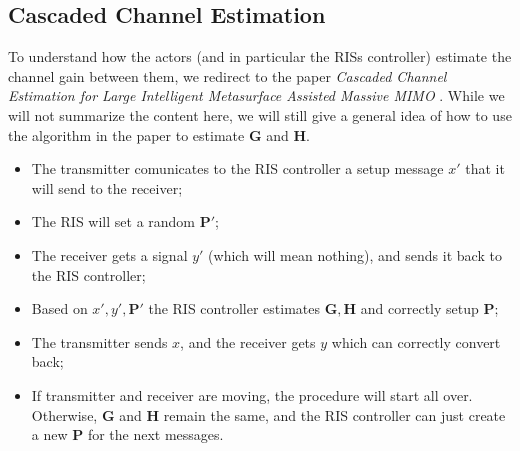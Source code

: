 \subsection{Cascaded Channel Estimation}
To understand how the actors (and in particular the RISs controller) estimate the channel gain between them, we redirect to the paper \textit{Cascaded Channel Estimation for Large Intelligent Metasurface Assisted Massive MIMO} \cite{8879620}. While we will not summarize the content here, we will still give a general idea of how to use the algorithm in the paper to estimate $\bm{G}$ and $\bm{H}$.
\begin{itemize}
  \item The transmitter comunicates to the RIS controller a setup message $x'$ that it will send to the receiver;
  \item The RIS will set a random $\bm{P}'$; %
  \item The receiver gets a signal $y'$ (which will mean nothing), and sends it back to the RIS controller;
  \item Based on $x', y', \bm{P}'$ the RIS controller estimates $\bm{G}, \bm{H}$ and correctly setup $\bm{P}$;
  \item The transmitter sends $x$, and the receiver gets $y$ which can correctly convert back;
  \item If transmitter and receiver are moving, the procedure will start all over. Otherwise, $\bm{G}$ and $\bm{H}$ remain the same, and the RIS controller can just create a new $\bm{P}$ for the next messages.
\end{itemize}
